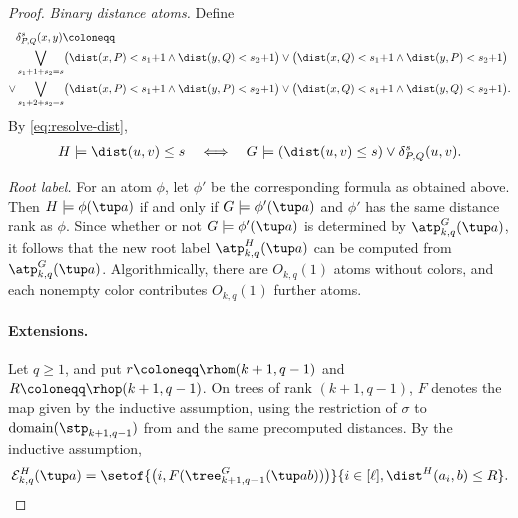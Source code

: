 \begin{proof}
\emph{Binary distance atoms.}
Define
\begin{align*}
&\delta^s_{P,Q}(x,y)\coloneqq\\
&\bigvee_{s_1+1+s_2=s}\bigl(\dist(x,P)<s_1{+}1\land\dist(y,Q)<s_2{+}1\bigr)\lor\bigl(\dist(x,Q)<s_1{+}1\land\dist(y,P)<s_2{+}1\bigr)\\
\lor{}&\bigvee_{s_1+2+s_2=s}\bigl(\dist(x,P)<s_1{+}1\land\dist(y,P)<s_2{+}1\bigr)\lor\bigl(\dist(x,Q)<s_1{+}1\land\dist(y,Q)<s_2{+}1\bigr).
\end{align*}
By \eqref{eq:resolve-dist},
\begin{align}\label{eq:bin-dist}
H\models\dist(u,v)\le s
\quad\Longleftrightarrow\quad
G\models(\dist(u,v)\le s)\lor\delta^s_{P,Q}(u,v).
\end{align}

\emph{Root label.}
For an atom \(\phi\), let $\phi'$ be the corresponding formula as obtained above.
Then $H\models\phi(\tup a)$ if and only if $G\models\phi'(\tup a)$ and $\phi'$ has the same distance rank as $\phi$.
Since whether or not $G\models\phi'(\tup a)$ is determined by $\atp^G_{k,q}(\tup a)$, it follows that the new root label $\atp^{H}_{k,q}(\tup a)$ can be computed  from $\atp^G_{k,q}(\tup a)$.
Algorithmically, there are $O_{k,q}(1)$ atoms without colors, and each nonempty color contributes $O_{k,q}(1)$ further atoms.

\paragraph{Extensions.}
Let $q\ge1$, and put $r\coloneqq\rhom(k+1,q-1)$ and $R\coloneqq\rhop(k+1,q-1)$.
On trees of rank $(k+1,q-1)$, $F$ denotes the map given by the inductive assumption, using the restriction of $\sigma$ to $\operatorname{domain}(\stp_{k+1,q-1})$ from  and the same precomputed distances.
By the inductive assumption,
\begin{align}\label{neqE}
\mathcal E^{H}_{k,q}(\tup a)=\setof{\bigl(i,F(\tree^G_{k+1,q-1}(\tup a b))\bigr)}{i\in[\ell], \dist^H(a_i,b)\le R}.
\end{align}


\end{proof}
